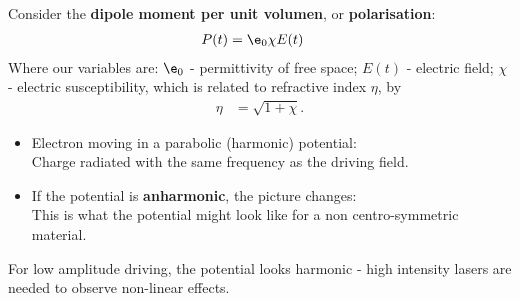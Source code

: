 \documentclass[a4paper, 11pt, normalem]{report}
\begin{document}
Consider the \textbf{dipole moment per unit volumen}, or \textbf{polarisation}:
\begin{align}
    P(t) &= \e_0\chi E(t)
\end{align}
Where our variables are: $\e_0$ - permittivity of free space; $E(t)$ - electric field; $\chi$ - electric susceptibility, which is related to refractive index $\eta$, by
\begin{align}
    \eta &= \sqrt{1+\chi}.
\end{align}
\begin{itemize}
    \item Electron moving in a parabolic (harmonic) potential:\\
        Charge radiated with the same frequency as the driving field. 
        \begin{figure}[H]
            \centering
        \end{figure}
    \item If the potential is \textbf{anharmonic}, the picture changes:\\
        This is what the potential might look like for a non centro-symmetric material. 
        \begin{figure}[H]
            \centering
        \end{figure}
\end{itemize}
For low amplitude driving, the potential looks harmonic - high intensity lasers are needed to observe non-linear effects.
\end{document}
